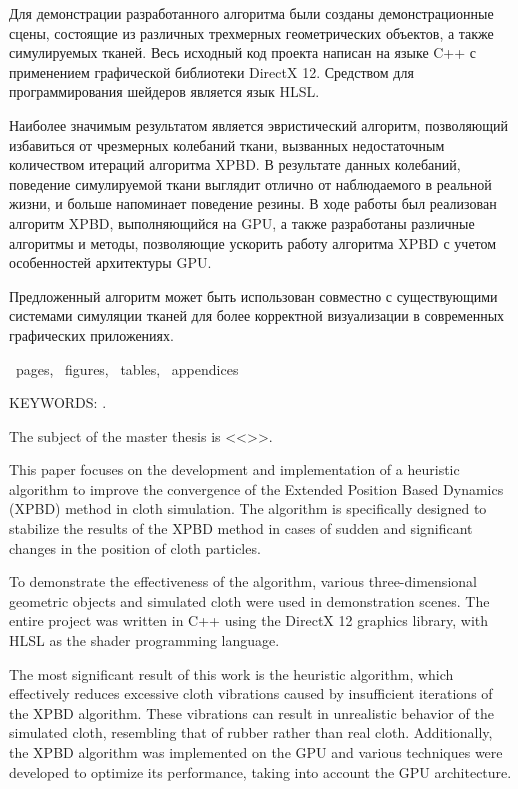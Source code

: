 Для демонстрации разработанного алгоритма были созданы демонстрационные сцены, состоящие из различных трехмерных геометрических объектов, а также симулируемых тканей. Весь исходный код проекта написан на языке C++ с применением графической библиотеки DirectX 12. Средством для программирования шейдеров является язык HLSL.

Наиболее значимым результатом является эвристический алгоритм, позволяющий избавиться от чрезмерных колебаний ткани, вызванных недостаточным количеством итераций алгоритма XPBD. В результате данных колебаний, поведение симулируемой ткани выглядит отлично от наблюдаемого в реальной жизни, и больше напоминает поведение резины. В ходе работы был реализован алгоритм XPBD, выполняющийся на GPU, а также разработаны различные алгоритмы и методы, позволяющие ускорить работу алгоритма XPBD с учетом особенностей архитектуры GPU.

Предложенный алгоритм может быть использован совместно с существующими системами симуляции тканей для более корректной визуализации в современных графических приложениях.


\newpage

\printTheAbstract %

~pages, 
~figures, 
~tables,
~appendices%

{\MakeUppercase{Keywords: \keywordsEn}.} %
	
The subject of the master thesis is <<\thesisTitleEn>>.
	
This paper focuses on the development and implementation of a heuristic algorithm to improve the convergence of the Extended Position Based Dynamics (XPBD) method in cloth simulation. The algorithm is specifically designed to stabilize the results of the XPBD method in cases of sudden and significant changes in the position of cloth particles. 

To demonstrate the effectiveness of the algorithm, various three-dimensional geometric objects and simulated cloth were used in demonstration scenes. The entire project was written in C++ using the DirectX 12 graphics library, with HLSL as the shader programming language. 

The most significant result of this work is the heuristic algorithm, which effectively reduces excessive cloth vibrations caused by insufficient iterations of the XPBD algorithm. These vibrations can result in unrealistic behavior of the simulated cloth, resembling that of rubber rather than real cloth. Additionally, the XPBD algorithm was implemented on the GPU and various techniques were developed to optimize its performance, taking into account the GPU architecture. 

